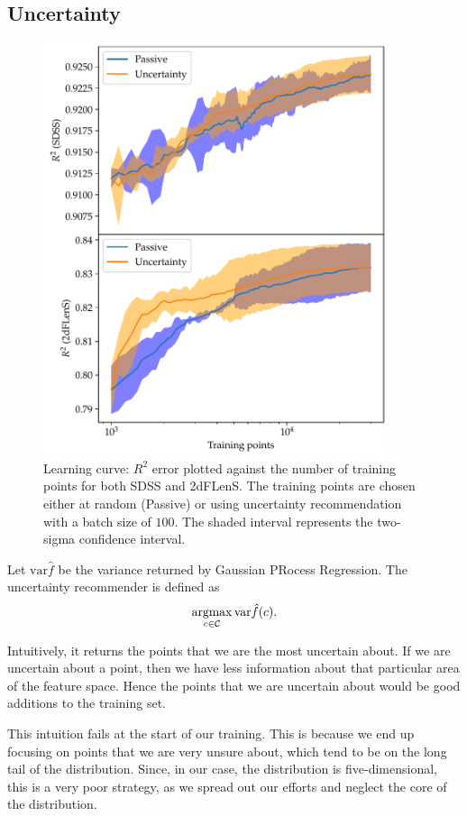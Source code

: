 \documentclass[11pt,twoside]{report}
\newcommand\cC{\mathcal{C}}
\newcommand\var{\mathrm{var}}
\DeclareMathOperator*{\argmax}{argmax}
\begin{document}
\subsection{Uncertainty}
  \begin{figure}
    \centering
    \includegraphics[width=0.9\textwidth]{uncertainty_r2.pdf}
    \caption{Learning curve: $R^2$ error plotted against the number of training points for both SDSS and 2dFLenS. The training points are chosen either at random (Passive) or using uncertainty recommendation with a batch size of $100$. The shaded interval represents the two-sigma confidence interval.}
    \label{fig:uncertainty_r2}
  \end{figure}

Let $\var \hat f$ be the variance returned by Gaussian PRocess Regression. The uncertainty recommender is defined as \[
    \argmax_{c \in \cC} \var\hat f(c) \text.
\]

Intuitively, it returns the points that we are the most uncertain about. If we are uncertain about a point, then we have less information about that particular area of the feature space. Hence the points that we are uncertain about would be good additions to the training set.

This intuition fails at the start of our training. This is because we end up focusing on points that we are very unsure about, which tend to be on the long tail of the distribution. Since, in our case, the distribution is five-dimensional, this is a very poor strategy, as we spread out our efforts and neglect the core of the distribution.
\end{document}
